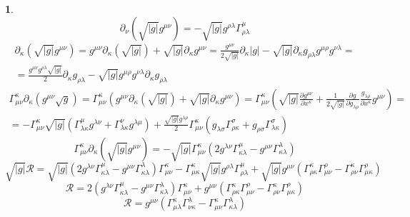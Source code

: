\documentclass[12pt]{article}
\theoremstyle{definition}
\newtheorem{zad}{}[section]
\begin{document}
\begin{zad}
\begin{equation}
\end{equation}
\begin{equation}
    \partial_\nu(\sqrt{|g|}g^{\mu\nu})=-\sqrt{|g|}g^{\rho\lambda}\Gamma^\mu_{\rho\lambda}
\end{equation}
\begin{multline}
    \partial_\kappa(\sqrt{|g|}g^{\mu\nu})=g^{\mu\nu}\partial_\kappa(\sqrt{|g|})+\sqrt{|g|}\partial_\kappa g^{\mu\nu}=\frac{g^{\mu\nu}}{2\sqrt{|g|}}\partial_\kappa|g|-\sqrt{|g|}\partial_\kappa g_{\rho\lambda}g^{\mu\rho}g^{\nu\lambda}=\\=\frac{g^{\mu\nu}g^{\rho\lambda}\sqrt{|g|}}{2}\partial_\kappa g_{\rho\lambda}-\sqrt{|g|}g^{\mu\rho}g^{\nu\lambda}\partial_\kappa g_{\rho\lambda}
\end{multline}
\begin{multline}
    \Gamma^\kappa_{\mu\nu}\partial_\kappa(g^{\mu\nu}\sqrt{g})=\Gamma^\kappa_{\mu\nu}(g^{\mu\nu}\partial_\kappa(\sqrt{|g|})+\sqrt{|g|}\partial_\kappa g^{\mu\nu})=\Gamma^\kappa_{\mu\nu}\left(\sqrt{|g|}\frac{\partial g^{\mu\nu}}{\partial x^\kappa}+\frac{1}{2\sqrt{|g|}}\frac{\partial g}{\partial g_{\lambda\rho}}\frac{g_{\lambda\rho}}{\partial x^\kappa}g^{\mu\nu}\right)=\\=-\Gamma^\kappa_{\mu\nu}\sqrt{|g|}(\Gamma^\mu_{\lambda\kappa}g^{\lambda\nu}+\Gamma^\nu_{\lambda\kappa}g^{\lambda\mu})+\frac{\sqrt{|g|}g^{\lambda\rho}}{2}\Gamma^\kappa_{\mu\nu}(g_{\lambda\sigma}\Gamma^\sigma_{\rho\kappa}+g_{\rho\sigma}\Gamma_{\lambda\kappa}^\sigma)
\end{multline}
\begin{equation}
    \Gamma^\kappa_{\mu\nu}\partial_\kappa(\sqrt{|g|}g^{\mu\nu})=-\sqrt{|g|}\Gamma^\kappa_{\mu\nu}(2g^{\lambda\nu}\Gamma^\mu_{\kappa\lambda}-g^{\mu\nu}\Gamma^\lambda_{\kappa\lambda})
\end{equation}
\begin{equation}
    \sqrt{|g|}\mathcal{R}=\sqrt{|g|}(2g^{\lambda\nu}\Gamma^\mu_{\kappa\lambda}-g^{\mu\nu}\Gamma^\lambda_{\kappa\lambda})\Gamma^\kappa_{\mu\nu}-\Gamma^\kappa_{\mu\kappa}\sqrt{|g|}g^{\rho\lambda}\Gamma^\mu_{\rho\lambda}+\sqrt{|g|}g^{\mu\nu}(\Gamma^\kappa_{\rho\kappa}\Gamma^\rho_{\mu\nu}-\Gamma^\kappa_{\rho\nu}\Gamma^\rho_{\mu\kappa})
\end{equation}
\begin{equation}
    \mathcal{R}=2(g^{\lambda\nu}\Gamma^\mu_{\kappa\lambda}-g^{\mu\nu}\Gamma^\lambda_{\kappa\lambda})\Gamma^\kappa_{\mu\nu}+g^{\mu\nu}(\Gamma^\kappa_{\rho\kappa}\Gamma^\rho_{\mu\nu}-\Gamma^\kappa_{\rho\nu}\Gamma^\rho_{\mu\kappa})
\end{equation}
\begin{equation}
    \boxed{\mathcal{R}=g^{\mu\nu}(\Gamma^\kappa_{\mu\lambda}\Gamma^\lambda_{\nu\kappa}-\Gamma^\kappa_{\mu\nu}\Gamma^\lambda_{\kappa\lambda})}
\end{equation}
\end{zad}
\end{document}
